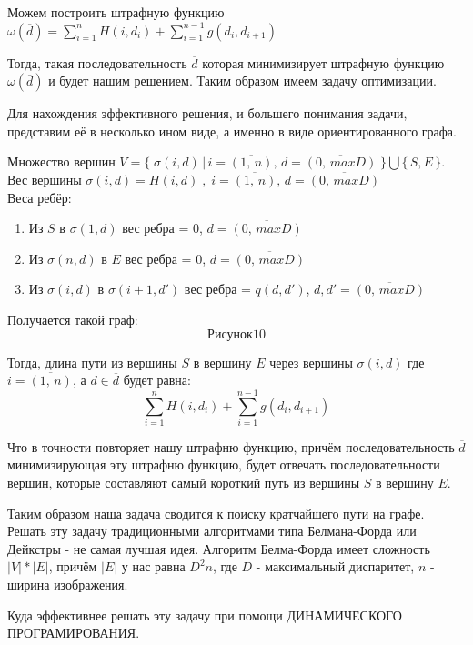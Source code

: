			
	
	Можем построить штрафную функцию 
	$\omega (\overline{d}) = \sum\limits_{i=1}^n H(i, d_i) + \sum\limits_{i=1}^{n-1} g(d_i, d_{i+1})$
	
	Тогда, такая последовательность $\overline{d}$ которая минимизирует штрафную функцию $\omega (\overline{d})$ и будет нашим решением. Таким образом имеем задачу оптимизации.
	
	Для нахождения эффективного решения, и большего понимания задачи,  представим её в несколько ином виде, а именно в виде ориентированного графа. 
	
	Множество вершин $V = \{ \; \sigma(i, d) \, | \, i = \overline{(1,\, n)}, \, d = \overline{(0, \, maxD )} \; \} \bigcup \{\,S, E\,\}$.\\
	Вес вершины $\sigma(i, d) = H(i, d) \;, \; i = \overline{(1,\, n)}, \, d = \overline{(0, \, maxD )}$\\
	Веса ребёр: 
	\begin{enumerate}
	\item Из $S$ в $\sigma(1, d)$ вес ребра = $0$, $d = \overline{(0,\, maxD)}$
	\item Из $\sigma(n, d)$ в $E$ вес ребра = $0$, $d = \overline{(0,\, maxD)}$
	\item Из $\sigma(i, d)$ в $\sigma(i+1, d')$ вес ребра = $q(d, d')$, $d, d' = \overline{(0,\, maxD)}$
	\end{enumerate}	
	
	Получается такой граф:
	$$Рисунок 10$$

 	
 	Тогда, длина пути из вершины $S$ в вершину $E$ через вершины $\sigma(i, d)$ где $i = \overline{(1,\, n)}$, а $d \in \overline{d}$ будет равна:
 	$$\sum\limits_{i=1}^n H(i, d_i) + \sum\limits_{i=1}^{n-1} g(d_i, d_{i+1})$$
 	
	Что в точности повторяет нашу штрафню функцию, причём последовательность $\overline{d}$ минимизирующая эту штрафню функцию, будет отвечать последовательности вершин, которые составляют самый короткий путь из вершины $S$ в вершину $E$.
	
	Таким образом наша задача сводится к поиску кратчайшего пути на графе.\\
	
	Решать эту задачу традиционными алгоритмами типа Белмана-Форда или Дейкстры - не самая лучшая идея. Алгоритм Белма-Форда имеет сложность $|V| * |E|$, причём $|E|$ у нас равна $D^2 n$, где $D$ - максимальный диспаритет, $n$ - ширина изображения.
	
	Куда эффективнее решать эту задачу при помощи ДИНАМИЧЕСКОГО ПРОГРАМИРОВАНИЯ. \\
	

